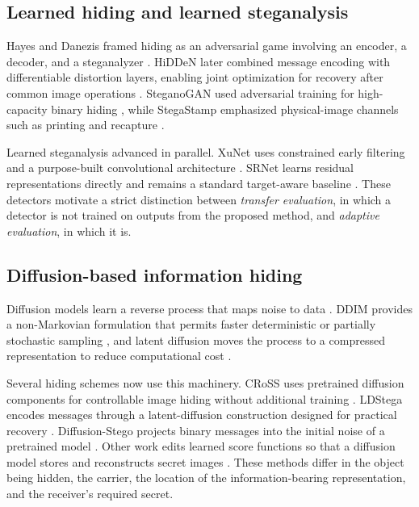 \documentclass[pdflatex,sn-mathphys-num]{sn-jnl}
\begin{document}
\subsection{Learned hiding and learned steganalysis}

Hayes and Danezis framed hiding as an adversarial game involving an encoder, a decoder, and a steganalyzer \cite{hayes2017generating}. HiDDeN later combined message encoding with differentiable distortion layers, enabling joint optimization for recovery after common image operations \cite{zhu2018hidden}. SteganoGAN used adversarial training for high-capacity binary hiding \cite{zhang2019steganogan}, while StegaStamp emphasized physical-image channels such as printing and recapture \cite{tancik2020stegastamp}.

Learned steganalysis advanced in parallel. XuNet uses constrained early filtering and a purpose-built convolutional architecture \cite{xu2016structural}. SRNet learns residual representations directly and remains a standard target-aware baseline \cite{boroumand2019deep}. These detectors motivate a strict distinction between \emph{transfer evaluation}, in which a detector is not trained on outputs from the proposed method, and \emph{adaptive evaluation}, in which it is.

\subsection{Diffusion-based information hiding}

Diffusion models learn a reverse process that maps noise to data \cite{ho2020denoising}. DDIM provides a non-Markovian formulation that permits faster deterministic or partially stochastic sampling \cite{song2021ddim}, and latent diffusion moves the process to a compressed representation to reduce computational cost \cite{rombach2022highresolution}.

Several hiding schemes now use this machinery. CRoSS uses pretrained diffusion components for controllable image hiding without additional training \cite{yu2023cross}. LDStega encodes messages through a latent-diffusion construction designed for practical recovery \cite{peng2024ldstega}. Diffusion-Stego projects binary messages into the initial noise of a pretrained model \cite{kim2025diffusionstego}. Other work edits learned score functions so that a diffusion model stores and reconstructs secret images \cite{chen2025hiding}. These methods differ in the object being hidden, the carrier, the location of the information-bearing representation, and the receiver's required secret.
\end{document}
